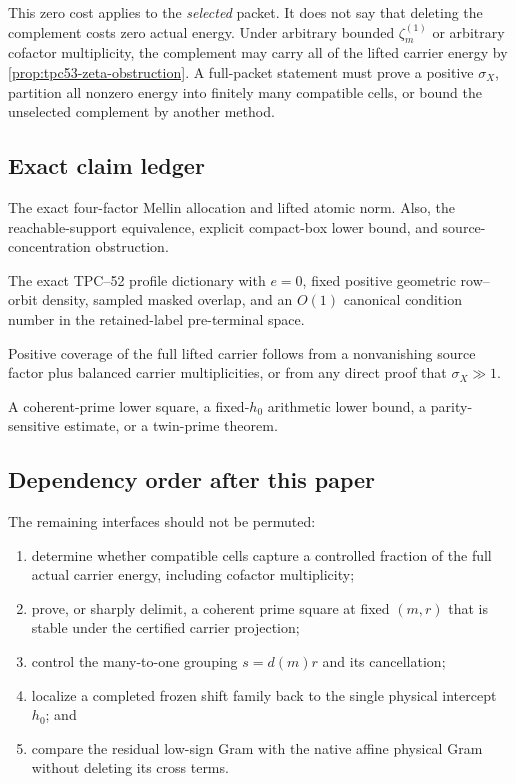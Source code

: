 This zero cost applies to the \emph{selected} packet.  It does not say
that deleting the complement costs zero actual energy.  Under arbitrary
bounded \(\zeta_m^{(1)}\) or arbitrary cofactor multiplicity, the
complement may carry all of the lifted carrier energy by
\cref{prop:tpc53-zeta-obstruction}.  A full-packet statement must prove a
positive \(\sigma_X\), partition all nonzero energy into finitely many
compatible cells, or bound the unselected complement by another method.

\subsection{Exact claim ledger}

\begin{description}[leftmargin=3.2em,style=nextline]
 \item[Proved exactly (L0).]
 The exact four-factor Mellin allocation and lifted atomic norm.  Also,
 the reachable-support equivalence, explicit compact-box lower bound,
 and source-concentration obstruction.
 \item[Proved on the literal selected packet (L1).]
 The exact TPC--52 profile dictionary with \(e=0\), fixed positive
 geometric row--orbit density, sampled masked overlap, and an \(O(1)\)
 canonical condition number in the retained-label pre-terminal space.
 \item[Conditional subgate.]
 Positive coverage of the full lifted carrier follows from a nonvanishing
 source factor plus balanced carrier multiplicities, or from any direct
 proof that \(\sigma_X\gg1\).
 \item[Not proved (L2).]
 A coherent-prime lower square, a fixed-\(h_0\) arithmetic lower bound,
 a parity-sensitive estimate, or a twin-prime theorem.
\end{description}

\subsection{Dependency order after this paper}

The remaining interfaces should not be permuted:
\begin{enumerate}[label=\textup{(O\arabic*)},leftmargin=3em]
 \item determine whether compatible cells capture a controlled fraction
 of the full actual carrier energy, including cofactor multiplicity;
 \item prove, or sharply delimit, a coherent prime square at fixed
 \((m,r)\) that is stable under the certified carrier projection;
 \item control the many-to-one grouping \(s=d(m)r\) and its cancellation;
 \item localize a completed frozen shift family back to the single
 physical intercept \(h_0\); and
 \item compare the residual low-sign Gram with the native affine
 physical Gram without deleting its cross terms.
\end{enumerate}

